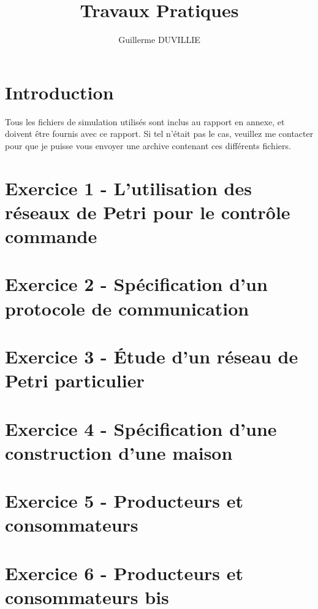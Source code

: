 \documentclass[a4paper,11pt]{article}
\author{}
\title{}
\title{Travaux Pratiques}
\author{Guillerme DUVILLIE}
\begin{document}
\maketitle

\section{Introduction}

Tous les fichiers de simulation utilisés sont inclus au rapport en annexe, et doivent être fournis
avec ce rapport. Si tel n'était pas le cas, veuillez me contacter pour que je puisse vous envoyer
une archive contenant ces différents fichiers.

\section{Exercice 1 - L'utilisation des réseaux de Petri pour le contrôle commande}



\section{Exercice 2 - Spécification d'un protocole de communication}



\section{Exercice 3 - Étude d'un réseau de Petri particulier}



\section{Exercice 4 - Spécification d'une construction d'une maison}



\section{Exercice 5 - Producteurs et consommateurs}



\section{Exercice 6 - Producteurs et consommateurs bis}
\end{document}
